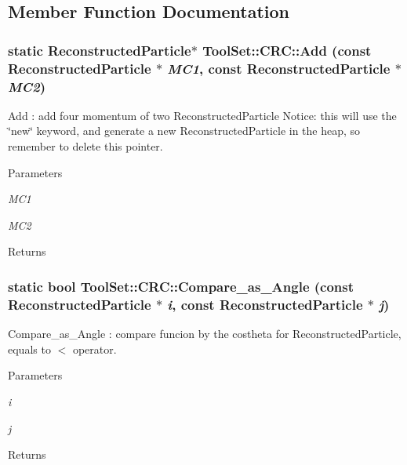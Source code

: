 \subsection{Member Function Documentation}
\hypertarget{classToolSet_1_1CRC_abc862ca6ed2bb7b78c4ff26316253dec}{
\subsubsection[{Add}]{\setlength{\rightskip}{0pt plus 5cm}static ReconstructedParticle$\ast$ ToolSet::CRC::Add (const ReconstructedParticle $\ast$ {\em MC1}, \/  const ReconstructedParticle $\ast$ {\em MC2})}}
\label{classToolSet_1_1CRC_abc862ca6ed2bb7b78c4ff26316253dec}


Add : add four momentum of two ReconstructedParticle Notice: this will use the \char`\"{}new\char`\"{} keyword, and generate a new ReconstructedParticle in the heap, so remember to delete this pointer. 
\begin{DoxyParams}{Parameters}
\item[{\em MC1}]\item[{\em MC2}]\end{DoxyParams}
\begin{DoxyReturn}{Returns}

\end{DoxyReturn}
\hypertarget{classToolSet_1_1CRC_aa6f188da873318b014914d2872c1f7d8}{
\subsubsection[{Compare\_\-as\_\-Angle}]{\setlength{\rightskip}{0pt plus 5cm}static bool ToolSet::CRC::Compare\_\-as\_\-Angle (const ReconstructedParticle $\ast$ {\em i}, \/  const ReconstructedParticle $\ast$ {\em j})}}
\label{classToolSet_1_1CRC_aa6f188da873318b014914d2872c1f7d8}


Compare\_\-as\_\-Angle : compare funcion by the costheta for ReconstructedParticle, equals to $<$ operator. 
\begin{DoxyParams}{Parameters}
\item[{\em i}]\item[{\em j}]\end{DoxyParams}
\begin{DoxyReturn}{Returns}

\end{DoxyReturn}


